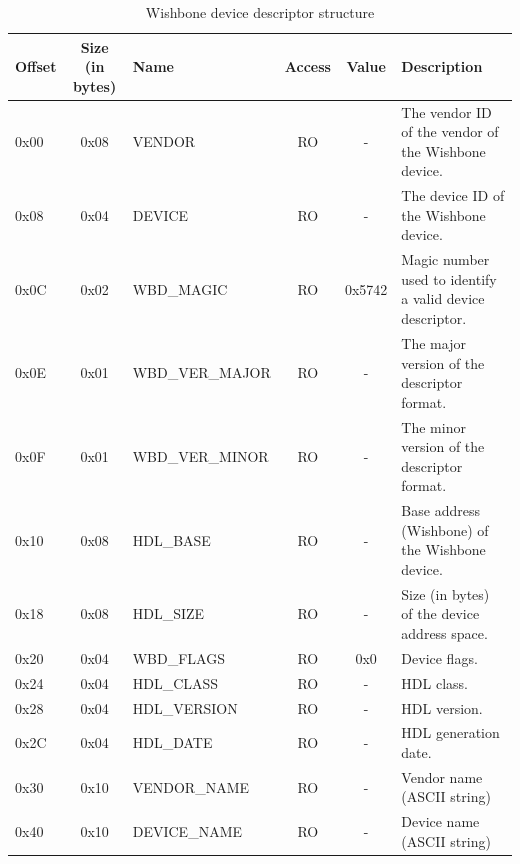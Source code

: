 \documentclass{article}
\begin{document}
\begin{center}
	\begin{savenotes}
	\begin{table}[!ht]\footnotesize
	\caption{Wishbone device descriptor structure}\label{dev_desc_struct}\centering
	\begin{tabular}{| l | c | l | c | c | p{5cm} |} \hline
	Offset & Size (in bytes) & Name & Access & Value & Description \\ \hline
	0x00 & 0x08 & VENDOR & RO & - & The vendor ID of the vendor of the Wishbone device. \\ \hline
	0x08 & 0x04 & DEVICE & RO & - & The device ID of the Wishbone device. \\ \hline
	0x0C & 0x02 & WBD\_MAGIC & RO & 0x5742 & Magic number used to identify a valid device descriptor. \\ \hline
	0x0E & 0x01 & WBD\_VER\_MAJOR & RO & - & The major version of the descriptor format. \\ \hline
	0x0F & 0x01 & WBD\_VER\_MINOR & RO & - & The minor version of the descriptor format. \\ \hline
	0x10 & 0x08 & HDL\_BASE & RO & - & Base address (Wishbone) of the Wishbone device. \\ \hline
	0x18 & 0x08 & HDL\_SIZE & RO & - & Size (in bytes) of the device address space. \\ \hline
	0x20 & 0x04 & WBD\_FLAGS & RO & 0x0 & Device flags. \\ \hline
	0x24 & 0x04 & HDL\_CLASS & RO & - & HDL class. \\ \hline
	0x28 & 0x04 & HDL\_VERSION & RO & - & HDL version. \\ \hline
	0x2C & 0x04 & HDL\_DATE & RO & - & HDL generation date. \\ \hline
	0x30 & 0x10 & VENDOR\_NAME & RO & - & Vendor name (ASCII string) \\ \hline
	0x40 & 0x10 & DEVICE\_NAME & RO & - & Device name (ASCII string) \\ \hline
	\end{tabular}
	\end{table}
	\end{savenotes}
\end{center}
\end{document}
